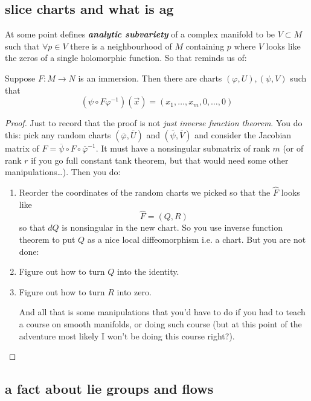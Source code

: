 \subsection{slice charts and what is ag}

At some point \cite{gri} defines \textit{\textbf{analytic subvariety}} of a complex manifold to be \(V \subset M\) such that \(\forall p \in V\) there is a neighbourhood of \(M\) containing \(p\) where \(V\) looks like the zeros of a single holomorphic function. So that reminds us of:

\begin{thm}\leavevmode
Suppose \(F:M \to N\) is an immersion. Then there are charts \((\varphi,U),(\psi,V)\) such that
\[(\psi \circ F \varphi^{-1})(\vec{x})=(x_1,\ldots,x_m,0,\ldots,0)\]
\end{thm}

\begin{proof}\leavevmode
Just to record that the proof is not \textit{just inverse function theorem}. You do this: pick any random charts \((\overline{\varphi},\overline{U})\) and \((\overline{\psi},\overline{V})\) and consider the Jacobian matrix of \(\hat{F}=\overline{\psi}\circ F \circ \overline{\varphi}^{-1}\). It must have a nonsingular submatrix of rank \(m\) (or of rank \(r\) if you go full constant tank theorem, but that would need some other manipulations…). Then you do:
\begin{enumerate}
\item Reorder the coordinates of the random charts we picked so that the \(\hat{F}\) looks like
	\[\hat{F}=(Q,R)\]
	so that \(dQ\) is nonsingular in the new chart. So you use inverse function theorem to put \(Q\) as a nice local diffeomorphism i.e. a chart. But you are not done:
 \item Figure out how to turn \(Q\) into the identity.
\item Figure out how to turn \(R\) into zero.

	And all that is some manipulations that you'd have to do if you had to teach a course on smooth manifolds, or doing such course (but at this point of the adventure most likely I won't be doing this course right?).
\end{enumerate}
\end{proof}

\subsection{a fact about lie groups and flows}

